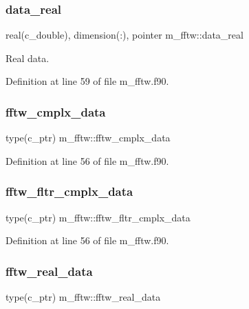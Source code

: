 \subsubsection{\texorpdfstring{data\+\_\+real}{data\_real}}
{\footnotesize\ttfamily real(c\+\_\+double), dimension(\+:), pointer m\+\_\+fftw\+::data\+\_\+real}



Real data. 



Definition at line 59 of file m\+\_\+fftw.\+f90.

\mbox{\label{namespacem__fftw_a5ec1a65aeb900c5fc0c437c04a15bb1c}} 
\subsubsection{\texorpdfstring{fftw\+\_\+cmplx\+\_\+data}{fftw\_cmplx\_data}}
{\footnotesize\ttfamily type(c\+\_\+ptr) m\+\_\+fftw\+::fftw\+\_\+cmplx\+\_\+data}



Definition at line 56 of file m\+\_\+fftw.\+f90.

\mbox{\label{namespacem__fftw_acf83109d9518ac141074223356bc9385}} 
\subsubsection{\texorpdfstring{fftw\+\_\+fltr\+\_\+cmplx\+\_\+data}{fftw\_fltr\_cmplx\_data}}
{\footnotesize\ttfamily type(c\+\_\+ptr) m\+\_\+fftw\+::fftw\+\_\+fltr\+\_\+cmplx\+\_\+data}



Definition at line 56 of file m\+\_\+fftw.\+f90.

\mbox{\label{namespacem__fftw_a0db6f31d6d28b16d18982654bd98501a}} 
\subsubsection{\texorpdfstring{fftw\+\_\+real\+\_\+data}{fftw\_real\_data}}
{\footnotesize\ttfamily type(c\+\_\+ptr) m\+\_\+fftw\+::fftw\+\_\+real\+\_\+data}



